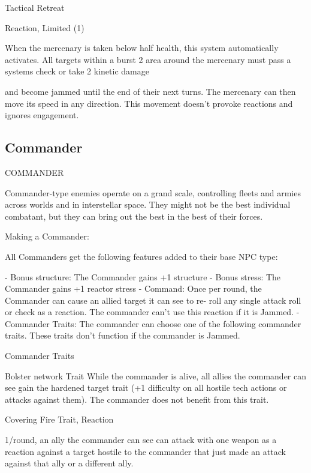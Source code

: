 Tactical Retreat
 
Reaction, Limited (1)
 
When the mercenary is taken below half health, this system automatically activates. All targets  
within a burst 2 area around the mercenary must pass a systems check or take 2 kinetic damage  

                                                                                                                   


and become jammed until the end of their next turns. The mercenary can then move its speed in  
any direction. This movement doesn't provoke reactions and ignores engagement.
 
\subsection{Commander}
                                              COMMANDER   

Commander-type enemies operate on a grand scale, controlling fleets and armies across worlds  
and in interstellar space. They might not be the best individual combatant, but they can bring out  
the best in the best of their forces.   

Making a Commander:
 
All Commanders get the following features added to their base NPC type:
 
    -    Bonus structure: The Commander gains +1 structure  
    -    Bonus stress: The Commander gains +1 reactor stress  
    -    Command: Once per round, the Commander can cause an allied target it can see to re- 
         roll any single attack roll or check as a reaction. The commander can’t use this reaction if  
         it is Jammed.  
    -    Commander Traits: The commander can choose one of the following commander traits.  
         These traits don’t function if the commander is Jammed.  

Commander Traits
 
Bolster network  
Trait  
While the commander is alive, all allies the commander can see gain the hardened target trait (+1  
difficulty on all hostile tech actions or attacks against them). The commander does not benefit  
from this trait.
 

Covering Fire  
Trait, Reaction
 
1/round, an ally the commander can see can attack with one weapon as a reaction against a  
target hostile to the commander that just made an attack against that ally or a different ally.
 

